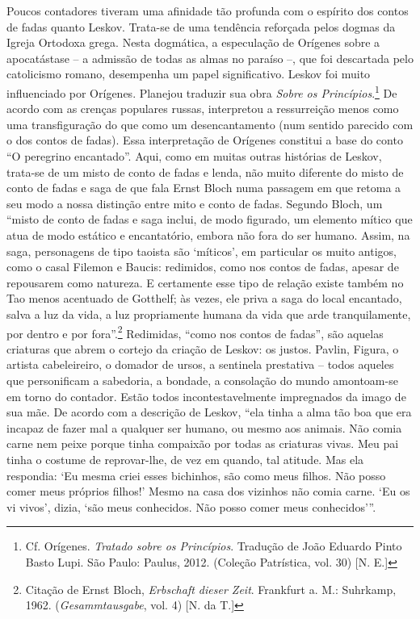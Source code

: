 Poucos contadores tiveram uma afinidade tão profunda com o espírito dos
contos de fadas quanto Leskov. Trata-se de uma tendência reforçada pelos
dogmas da Igreja Ortodoxa grega. Nesta dogmática, a especulação de
Orígenes sobre a apocatástase -- a admissão de todas as almas no paraíso
--, que foi descartada pelo catolicismo romano, desempenha um papel
significativo. Leskov foi muito influenciado por Orígenes. Planejou
traduzir sua obra \emph{Sobre os Princípios}.\footnote{Cf. Orígenes.
  \emph{Tratado sobre os Princípios}. Tradução de João Eduardo Pinto
  Basto Lupi. São Paulo: Paulus, 2012. (Coleção Patrística, vol. 30)
  {[}N. E.{]}} De acordo com as crenças populares russas, interpretou a
ressurreição menos como uma transfiguração do que como um
desencantamento (num sentido parecido com o dos contos de fadas). Essa
interpretação de Orígenes constitui a base do conto ``O peregrino
encantado''. Aqui, como em muitas outras histórias de Leskov, trata-se
de um misto de conto de fadas e lenda, não muito diferente do misto de
conto de fadas e saga de que fala Ernst Bloch numa passagem em que
retoma a seu modo a nossa distinção entre mito e conto de fadas. Segundo
Bloch, um ``misto de conto de fadas e saga inclui, de modo figurado, um
elemento mítico que atua de modo estático e encantatório, embora não
fora do ser humano. Assim, na saga, personagens de tipo taoista são
`míticos', em particular os muito antigos, como o casal Filemon e
Baucis: redimidos, como nos contos de fadas, apesar de repousarem como
natureza. E certamente esse tipo de relação existe também no Tao menos
acentuado de Gotthelf; às vezes, ele priva a saga do local encantado,
salva a luz da vida, a luz propriamente humana da vida que arde
tranquilamente, por dentro e por fora''.\footnote{Citação de Ernst
  Bloch, \emph{Erbschaft dieser Zeit}. Frankfurt a. M.: Suhrkamp, 1962.
  (\emph{Gesammtausgabe}, vol. 4) {[}N. da T.{]}} Redimidas, ``como nos
contos de fadas'', são aquelas criaturas que abrem o cortejo da criação
de Leskov: os justos. Pavlin, Figura, o artista cabeleireiro, o domador
de ursos, a sentinela prestativa -- todos aqueles que personificam a
sabedoria, a bondade, a consolação do mundo amontoam-se em torno do
contador. Estão todos incontestavelmente impregnados da imago de sua
mãe. De acordo com a descrição de Leskov, ``ela tinha a alma tão boa que
era incapaz de fazer mal a qualquer ser humano, ou mesmo aos animais.
Não comia carne nem peixe porque tinha compaixão por todas as criaturas
vivas. Meu pai tinha o costume de reprovar-lhe, de vez em quando, tal
atitude. Mas ela respondia: `Eu mesma criei esses bichinhos, são como
meus filhos. Não posso comer meus próprios filhos!' Mesmo na casa dos
vizinhos não comia carne. `Eu os vi vivos', dizia, `são meus conhecidos.
Não posso comer meus conhecidos'''.

